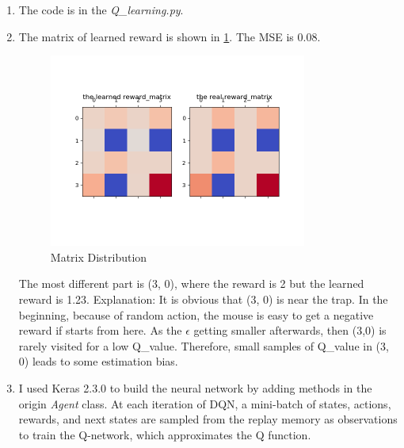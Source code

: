 \documentclass[a4paper]{article}
\begin{document}
\begin{enumerate}
  \setlength{\itemsep}{4\parskip}
  \item The code is in the \emph{Q\_learning.py}.
  \item 
  The matrix of learned reward is shown in \ref{fig:1}. The MSE is 0.08.
  \begin{figure}[htbp]
    \centering
    \includegraphics[width = 0.8\textwidth]{../distribution.png}
    \caption{Matrix Distribution}
    \label{fig:1}
  \end{figure}
  \newline The most different part is (3, 0), where the reward is 2 but the learned reward is 1.23.
  \newline Explanation: It is obvious that (3, 0) is near the trap. In the beginning, because of random action, the mouse is easy to get a negative reward if starts from here.
  As the $\epsilon$ getting smaller afterwards, then (3,0) is rarely visited for a low Q\_value. 
  Therefore, small samples of Q\_value in (3, 0) leads to some estimation bias.
\newpage

  \item I used Keras 2.3.0 to build the neural network by adding methods in the origin \emph{Agent} class. 
  At each iteration of DQN, a mini-batch of states, actions, rewards, and next states are sampled from the replay memory as observations to train the Q-network, which approximates the Q function.
  
  

\end{enumerate}
\end{document}
